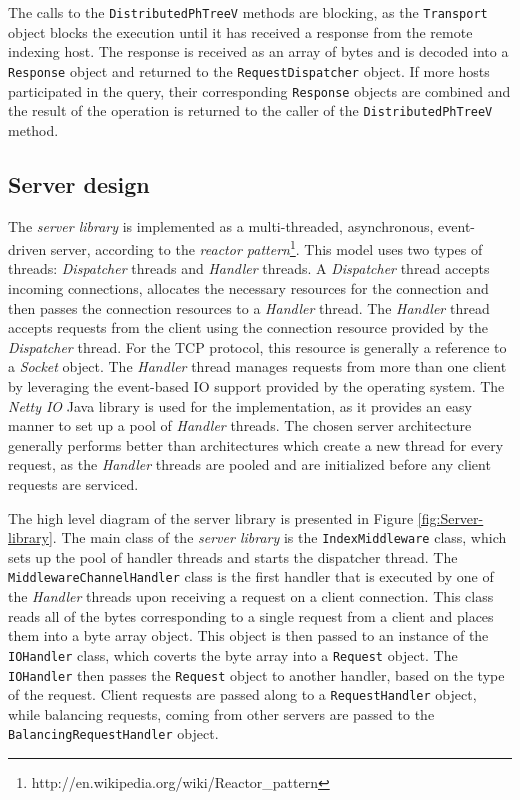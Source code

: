 \documentclass[11pt,a4paper]{globis-book}
\begin{document}
The calls to the \texttt{DistributedPhTreeV} methods are blocking, as the \texttt{Transport} object blocks the execution until it has received a response from the remote indexing host. The response is received as an array of bytes and is decoded into a \texttt{Response} object and returned to the \texttt{RequestDispatcher} object. If more hosts participated in the query, their corresponding \texttt{Response} objects are combined and the result of the operation is returned to the caller of the \texttt{DistributedPhTreeV} method. 

\subsection{Server design}

The \textit{server library} is implemented as a multi-threaded, asynchronous, event-driven server, according to the \textit{reactor pattern}\footnote{http://en.wikipedia.org/wiki/Reactor\_pattern}. This model uses two types of threads: \textit{Dispatcher} threads and \textit{Handler} threads. A \textit{Dispatcher} thread accepts incoming connections, allocates the necessary resources for the connection and then passes the connection resources to a \textit{Handler} thread. The \textit{Handler} thread accepts requests from the client using the connection resource provided by the \textit{Dispatcher} thread. For the TCP protocol, this resource is generally a reference to a \textit{Socket} object. The \textit{Handler} thread manages requests from more than one client by leveraging the event-based IO support provided by the operating system. The \textit{Netty IO} Java library is used for the implementation, as it provides an easy manner to set up a pool of \textit{Handler} threads. The chosen server architecture generally performs better than architectures which create a new thread for every request, as the \textit{Handler} threads are pooled and are initialized before any client requests are serviced. 

The high level diagram of the server library is presented in Figure \ref{fig:Server-library}. The main class of the \textit{server library} is the \texttt{IndexMiddleware} class, which sets up the pool of handler threads and starts the dispatcher thread. The \texttt{MiddlewareChannelHandler} class is the first handler that is executed by one of the \textit{Handler} threads upon receiving a request on a client connection. This class reads all of the bytes corresponding to a single request from a client and places them into a byte array object. This object is then passed to an instance of the \texttt{IOHandler} class, which coverts the byte array into a \texttt{Request} object. The \texttt{IOHandler} then passes the \texttt{Request} object to another handler, based on the type of the request. Client requests are passed along to a \texttt{RequestHandler} object, while balancing requests, coming from other servers are passed to the \texttt{BalancingRequestHandler} object. 
\end{document}
